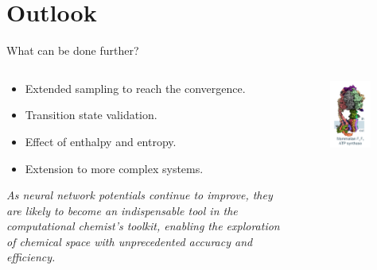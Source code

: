 \documentclass[11pt,t]{beamer}
\begin{document}
\section{Outlook}
\begin{frame}{What can be done further?}
	\begin{columns}[t]
		\begin{column}{.65\textwidth}
		\vspace{-10pt}
		\small
		\begin{itemize}
			\item Extended sampling to reach the convergence.
			\item Transition state validation.
			\item Effect of enthalpy and entropy.
			\item Extension to more complex systems.
		\end{itemize}
		\textit{As neural network potentials continue to improve, they are likely to become an indispensable tool in the computational chemist's toolkit, enabling the exploration of chemical space with unprecedented accuracy and efficiency.}	
		\end{column}
		\begin{column}{.35\textwidth}
			\vspace{-30pt}
			\begin{figure}
				\centering
				\includegraphics[width=0.9\textwidth]{Figures/outlook_atp_synthase.pdf}

\end{figure}
\end{column}
\end{columns}
\end{frame}
\end{document}
